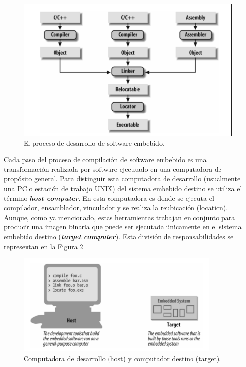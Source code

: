 \documentclass[output=paper, 
colorlinks,
citecolor=brown,
newtxmath
]{langscibook}
\begin{document}
\begin{figure}
\includegraphics[width=\linewidth]{images/ciclo_de_compilacion.png}
\caption{El proceso de desarrollo de software embebido.}
\label{fig:compilacion}
\end{figure}



Cada paso del proceso de compilación de software embebido
es una transformación realizada por software ejecutado en una computadora
de propósito general. Para distinguir esta computadora de desarrollo (usualmente una 
PC o estación de trabajo UNIX) del sistema embebido destino se utiliza el término \textit{\textbf{host computer}}.
En esta computadora es donde se ejecuta el compilador, ensamblador, vinculador y se realiza la reubicación (location).
Aunque, como ya mencionado, estas herramientas trabajan en conjunto
para producir una imagen binaria que puede ser ejecutada
únicamente en el sistema embebido destino (\textit{\textbf{target
computer}}). Esta división de responsabilidades
se representan en la Figura \ref{fig:compilacion2}

\begin{figure}[H]
\includegraphics[width=10cm]{images/host_target.png}
\caption{Computadora de desarrollo (host) y computador destino (target).}
\label{fig:compilacion2}
\end{figure}
\end{document}

